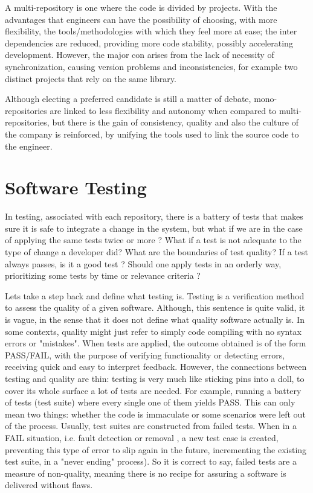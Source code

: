 A multi-repository is one where the code is divided by projects. With the advantages that engineers can have the possibility of choosing, with more flexibility, the tools/methodologies with which they feel more at ease; the inter dependencies are reduced, providing more code stability, possibly accelerating development. However, the major con arises from the lack of necessity of synchronization, causing version problems and inconsistencies, for example two distinct projects that rely on the same library.

Although electing a preferred candidate is still a matter of debate, mono-repositories are linked to less flexibility and autonomy when compared to multi-repositories, but there is the gain of consistency, quality and also the culture of the company is reinforced, by unifying the tools used to link the source code to the engineer.\cite{Jaspan:2018:ADM:3183519.3183550}


\section{Software Testing}
In testing, associated with each repository, there is a battery of tests that makes sure it is safe to integrate a change in the system, but what if we are in the case of applying the same tests twice or more ? What if a test is not adequate to the type of change a developer did? What are the boundaries of test quality? If a test always passes, is it a good test ? Should one apply tests in an orderly way, prioritizing some tests by time or relevance criteria ? 

Lets take a step back and define what testing is. Testing is a verification method to assess the quality of a given software. Although, this sentence is quite valid, it is vague, in the sense that it does not define what quality software actually is. In some contexts, quality might just refer to simply code compiling with no syntax errors or "mistakes". When tests are applied, the outcome obtained is of the form PASS/FAIL, with the purpose of verifying functionality or detecting errors, receiving quick and easy to interpret feedback. However, the connections between testing and quality are thin: testing is very much like sticking pins into a doll, to cover its whole surface a lot of tests are needed. For example, running a battery of tests (test suite) where every single one of them yields PASS. This can only mean two things: whether the code is immaculate or some scenarios were left out of the process. Usually, test suites are constructed from failed tests. When in a FAIL situation, i.e. fault detection or removal , a new test case is created, preventing this type of error to slip again in the future, incrementing the existing test suite, in a "never ending" process). So it is correct to say, failed tests are a measure of non-quality, meaning there is no recipe for assuring a software is delivered without flaws.  \cite{7PrinciplesSoftTest}

